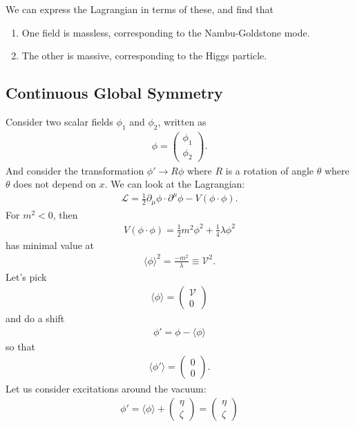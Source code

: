 \documentclass[a4paper,11pt]{article}
\numberwithin{equation}{section}
\theoremstyle{definition}
\newcommand{\p}{\partial}
\newcommand{\lag}{\mathcal{L}}
\begin{document}
We can express the Lagrangian in terms of these, and find that 
\begin{enumerate}
	\item One field is massless, corresponding to the Nambu-Goldstone mode.
	\item The other is massive, corresponding to the Higgs particle. 
\end{enumerate}


\subsection{Continuous Global Symmetry}
Consider two scalar fields $\phi_1$ and $\phi_2$, written as
\begin{align}
\phi = \begin{pmatrix}
\phi_1 \\ \phi_2
\end{pmatrix}.
\end{align}
And consider the transformation $\phi' \to R\phi$ where $R$ is a rotation of angle $\theta$ where $\theta$ does not depend on $x$. We can look at the Lagrangian:
\begin{align}
\lag = \frac{1}{2}\p_\mu \phi \cdot \p^\mu \phi - V(\phi \cdot \phi).
\end{align}
For $m^2 < 0$, then 
\begin{align}
V(\phi\cdot \phi) = \frac{1}{2}m^2 \phi^2 + \frac{1}{4}\lambda\phi^2
\end{align}
has minimal value at
\begin{align}
\langle \phi \rangle^2 = \frac{-m^2}{\lambda} \equiv \mathcal{V}^2.
\end{align}
Let's pick 
\begin{align}
\langle \phi \rangle = \begin{pmatrix}
\mathcal{V}\\0
\end{pmatrix}
\end{align}
and do a shift
\begin{align}
\phi' = \phi - \langle \phi \rangle
\end{align}
so that 
\begin{align}
\langle \phi' \rangle = \begin{pmatrix}
0\\0
\end{pmatrix}.
\end{align}
Let us consider excitations around the vacuum:
\begin{align}
\phi' = \langle \phi \rangle + \begin{pmatrix}
\eta \\\zeta
\end{pmatrix} = \begin{pmatrix}
\eta \\ \zeta
\end{pmatrix}
\end{align}
\end{document}
